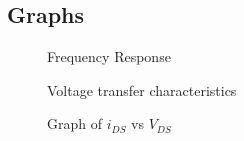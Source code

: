 \documentclass{report}[12pt]
\begin{document}
\subsection*{Graphs}
\begin{figure}[ht]
    \centering
    \caption{Frequency Response}
    \label{fig:fr1}
\end{figure}
\begin{figure}[ht]
    \centering
    \caption{Voltage transfer characteristics}
    \label{fig:vtc}
\end{figure}
\newpage
\begin{figure}[ht]
    \centering
    \caption{Graph of $i_{DS}$ vs $V_{DS}$}
    \label{fig:i_vs_vds}
\end{figure}
\end{document}
